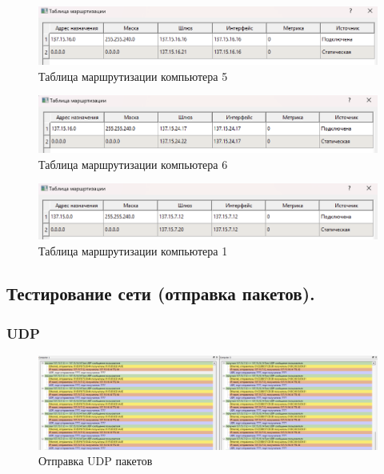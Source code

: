 \documentclass[12pt,onecolumn]{article}
\begin{document}
\begin{figure}[H]
    \centering
    \includegraphics[width=\textwidth]{image/part-3/computer5.png}
    \caption{Таблица маршрутизации компьютера 5}
\end{figure}

\begin{figure}[H]
    \centering
    \includegraphics[width=\textwidth]{image/part-3/computer6.png}
    \caption{Таблица маршрутизации компьютера 6}
\end{figure}

\begin{figure}[H]
    \centering
    \includegraphics[width=\textwidth]{image/part-3/computer1.png}
    \caption{Таблица маршрутизации компьютера 1}
\end{figure}
\subsection{Тестирование сети (отправка пакетов).}
\subsubsection{UDP}
\begin{figure}[H]
    \centering
    \includegraphics[width=\textwidth]{image/part-3/udp.png}
    \caption{Отправка UDP пакетов}
\end{figure}
\end{document}
